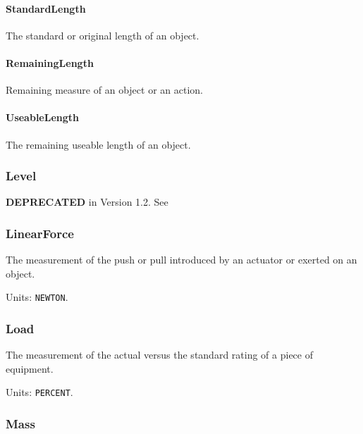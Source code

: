 \paragraph{StandardLength}\mbox{}
\label{sec:StandardLength}


The standard or original length of an object.


\paragraph{RemainingLength}\mbox{}
\label{sec:RemainingLength}


Remaining measure of an object or an action.


\paragraph{UseableLength}\mbox{}
\label{sec:UseableLength}


The remaining useable length of an object.


\subsubsection{Level}
\label{sec:Level}



\textbf{DEPRECATED} in Version 1.2.  See 


\subsubsection{LinearForce}
\label{sec:LinearForce}



The measurement of the push or pull introduced by an actuator or exerted on an object.


Units: \texttt{NEWTON}.

\subsubsection{Load}
\label{sec:Load}



The measurement of the actual versus the standard rating of a piece of equipment.


Units: \texttt{PERCENT}.

\subsubsection{Mass}
\label{sec:Mass}



